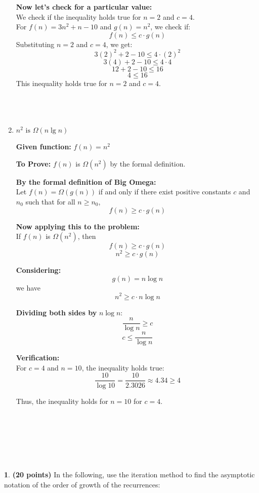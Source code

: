 \documentclass[11pt]{article}
\theoremstyle{definition}
\newtheorem{prob}{}
\newcommand{\solution}{\medskip\noindent{\color{DarkBlue}\textbf{Solution:}}}
\begin{document}
\begin{enumerate}[label=(\alph*)]
\textbf{Now let's check for a particular value:}\\
We check if the inequality holds true for \( n = 2 \) and \( c = 4 \).\\

For \( f(n) = 3n^2 + n - 10 \) and \( g(n) = n^2 \), we check if:
\[
f(n) \leq c \cdot g(n)
\]
Substituting \( n = 2 \) and \( c = 4 \), we get:
\[
3(2)^2 + 2 - 10 \leq 4 \cdot (2)^2
\]
\[
3(4) + 2 - 10 \leq 4 \cdot 4
\]
\[
12 + 2 - 10 \leq 16
\]
\[
4 \leq 16
\]
This inequality holds true for \( n = 2 \) and \( c = 4 \).
\\ \\ \\ \\
\item $n^2 \text { is } \Omega(n\lg n)$ \\
\solution

\textbf{Given function:} \( f(n) = n^2 \)

\textbf{To Prove:} \( f(n) \) is \( \Omega(n^2) \) by the formal definition.

\textbf{By the formal definition of Big Omega:}\\
Let \( f(n) = \Omega(g(n)) \) if and only if there exist positive constants \( c \) and \( n_0 \) such that for all \( n \geq n_0 \),
\[
f(n) \geq c \cdot g(n)
\]

\textbf{Now applying this to the problem:}\\
If \( f(n) \) is \( \Omega(n^2) \), then
\[
f(n) \geq c \cdot g(n)
\]
\[
n^2 \geq c \cdot g(n)
\]

\textbf{Considering:} 
\[
g(n) = n \log n
\]
we have
\[
n^2 \geq c \cdot n \log n
\]

\textbf{Dividing both sides by} \( n \log n \):
\[
\frac{n}{\log n} \geq c
\]
\[
c \leq \frac{n}{\log n}
\]

\textbf{Verification:}\\
For \( c = 4 \) and \( n = 10 \), the inequality holds true:
\[
\frac{10}{\log 10} = \frac{10}{2.3026} \approx 4.34 \geq 4
\]

Thus, the inequality holds for \( n = 10 \) for \( c = 4 \).

\end{enumerate}
\\
\\
\\
\\
\\
\begin{prob} \textbf{(20 points)} In the following, use the iteration method to find the asymptotic notation of the order of growth of the recurrences:
\end{prob}
\end{document}
